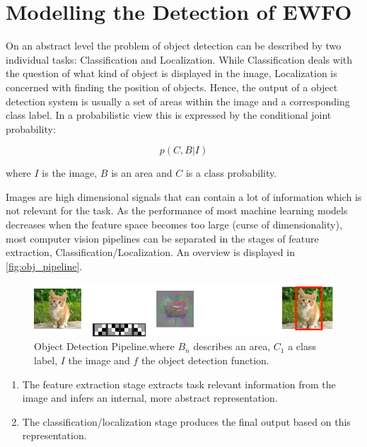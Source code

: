 	\chapter{Modelling the Detection of \ac{EWFO}}
	
	\label{sec:object_detection}
	
On an abstract level the problem of object detection can be described by two individual tasks: Classification and Localization. While Classification deals with the question of what kind of object is displayed in the image, Localization is concerned with finding the position of objects. Hence, the output of a object detection system is usually a set of areas within the image and a corresponding class label. In a probabilistic view this is expressed by the conditional joint probability:

	\begin{equation}
		p(C,B|I)
	\end{equation}

	where $I$ is the image, $B$ is an area and $C$ is a class probability.

	Images are high dimensional signals that can contain a lot of information which is not relevant for the task. As the performance of most machine learning models decreases when the feature space becomes too large (curse of dimensionality), most computer vision pipelines can be separated in the stages of feature extraction, Classification/Localization. An overview is displayed in \autoref{fig:obj_pipeline}.
	
	\begin{figure}[hbtp]
	
	\centering
	\includegraphics[width=\linewidth]{fig/ObjectDetection}
	\caption{Object Detection Pipeline.where $B_n$ describes an area, $C_1$ a class label, $I$ the image and $f$ the object detection function.}
	\label{fig:obj_pipeline}
	
	\end{figure}

	\begin{enumerate}
	\item The feature extraction stage extracts task relevant information from the image and infers an internal, more abstract representation.

	\item The classification/localization stage produces the final output based on this representation.

	\end{enumerate}


